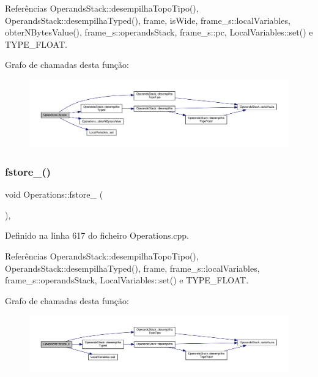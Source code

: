 Referências Operands\+Stack\+::desempilha\+Topo\+Tipo(), Operands\+Stack\+::desempilha\+Typed(), frame, is\+Wide, frame\+\_\+s\+::local\+Variables, obter\+N\+Bytes\+Value(), frame\+\_\+s\+::operands\+Stack, frame\+\_\+s\+::pc, Local\+Variables\+::set() e T\+Y\+P\+E\+\_\+\+F\+L\+O\+AT.

Grafo de chamadas desta função\+:\nopagebreak
\begin{figure}[H]
\begin{center}
\leavevmode
\includegraphics[width=350pt]{classOperations_a42a0b3220b593059320cf7d5a5eed6e2_cgraph}
\end{center}
\end{figure}
\mbox{\label{classOperations_a7465534bbf4e4ca9f0493a8dbe645d46}} 
\subsubsection{\texorpdfstring{fstore\+\_()}{fstore\_0()}}
{\footnotesize\ttfamily void Operations\+::fstore\+\_ (\begin{DoxyParamCaption}{ }\end{DoxyParamCaption})\hspace{0.3cm}{\ttfamily [static]}, {\ttfamily [private]}}



Definido na linha 617 do ficheiro Operations.\+cpp.



Referências Operands\+Stack\+::desempilha\+Topo\+Tipo(), Operands\+Stack\+::desempilha\+Typed(), frame, frame\+\_\+s\+::local\+Variables, frame\+\_\+s\+::operands\+Stack, Local\+Variables\+::set() e T\+Y\+P\+E\+\_\+\+F\+L\+O\+AT.

Grafo de chamadas desta função\+:\nopagebreak
\begin{figure}[H]
\begin{center}
\leavevmode
\includegraphics[width=350pt]{classOperations_a7465534bbf4e4ca9f0493a8dbe645d46_cgraph}
\end{center}
\end{figure}
\mbox{\label{classOperations_a2ea876acd29db9eec798302229bfd5e5}} 
